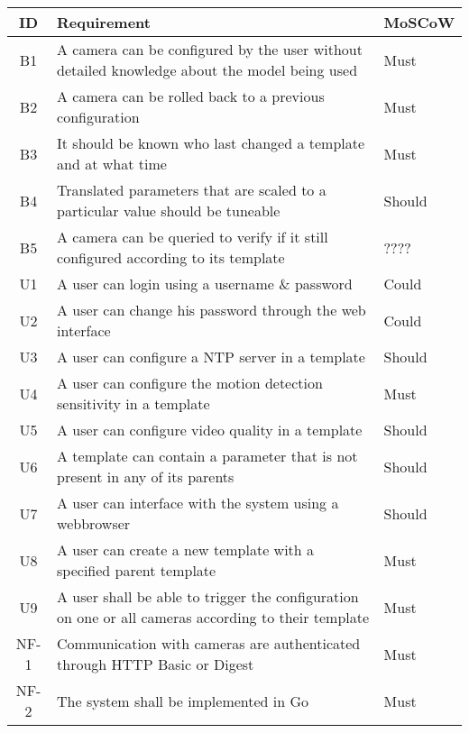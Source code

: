 \begin{table}[h]
    \centering
    \begin{tabulary}{\linewidth}{CLL}
        \textbf{ID} & \textbf{Requirement} & \textbf{MoSCoW}
        \\ \hline %
        B1 & A camera can be configured by the user without detailed knowledge about the model being used & Must
        \\ \hline
        B2 & A camera can be rolled back to a previous configuration & Must
        \\ \hline
        B3 & It should be known who last changed a template and at what time & Must
        \\ \hline
        B4 & Translated parameters that are scaled to a particular value should be tuneable & Should
        \\ \hline
        B5 & A camera can be queried to verify if it still configured according to its template & ????
        \\ \hline
        U1 & A user can login using a username \& password & Could
        \\ \hline
        U2 & A user can change his password through the web interface & Could
        \\ \hline
        U3 & A user can configure a NTP server in a template & Should
        \\ \hline
        U4 & A user can configure the motion detection sensitivity in a template & Must
        \\ \hline
        U5 & A user can configure video quality in a template & Should
        \\ \hline
        U6 & A template can contain a parameter that is not present in any of its parents & Should
        \\ \hline
        U7 & A user can interface with the system using a webbrowser & Should
        \\ \hline
        U8 & A user can create a new template with a specified parent template & Must
        \\ \hline
        U9 & A user shall be able to trigger the configuration on one or all cameras according to their template & Must
        \\ \hline
        NF-1 & Communication with cameras are authenticated through HTTP Basic or Digest & Must
        \\ \hline
        NF-2 & The system shall be implemented in Go & Must

\end{tabulary}
\end{table}
